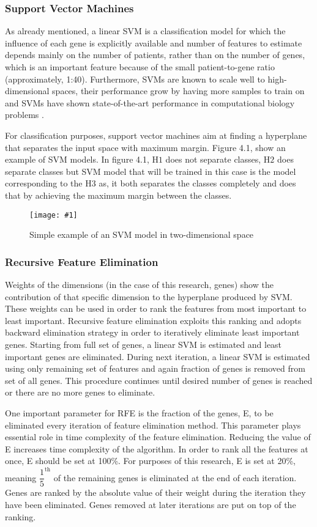 \documentclass{ba-kecs}
\numberwithin{figure}{section}
\numberwithin{equation}{section}
\newcommand{\dkepic}[2]{ %
	\begin{figure}[H] %
	\centerline{\texttt{[image: \#1]}}
	\caption{#2}
	\label{#1}
	\end{figure}
}
\begin{document}
\subsubsection{Support Vector Machines}

As already mentioned, a linear SVM is a classification model for which the influence of each gene is explicitly available and number of features to estimate depends mainly on the number of patients, rather than on the number of genes, which is an important feature because of the small patient-to-gene ratio (approximately, 1:40). Furthermore, SVMs are known to scale well to high-dimensional spaces, their performance grow by having more samples to train on and SVMs have shown state-of-the-art performance in computational biology problems \cite{benhur}.

For classification purposes, support vector machines aim at finding a hyperplane that separates the input space with maximum margin. Figure 4.1, show an example of SVM models. In figure 4.1, $\mathrm{H1}$ does not separate classes, $\mathrm{H2}$ does separate classes but SVM model that will be trained in this case is the model corresponding to the $\mathrm{H3}$ as, it both separates the classes completely and does that by achieving the maximum margin between the classes.
\dkepic{SVM}{Simple example of an SVM model in two-dimensional space}

\subsubsection{Recursive Feature Elimination}

Weights of the dimensions (in the case of this research, genes) show the contribution of that specific dimension to the hyperplane produced by SVM. These weights can be used in order to rank the features from most important to least important. Recursive feature elimination exploits this ranking and adopts backward elimination strategy in order to iteratively eliminate least important genes. Starting from full set of genes, a linear SVM is estimated and least important genes are eliminated. During next iteration, a linear SVM is estimated using only remaining set of features and again fraction of genes is removed from set of all genes. This procedure continues until desired number of genes is reached or there are no more genes to eliminate. 

One important parameter for RFE is the fraction of the genes, E, to be eliminated every iteration of feature elimination method. This parameter plays essential role in time complexity of the feature elimination. Reducing the value of E increases time complexity of the algorithm. In order to rank all the features at once, E should be set at 100\%. For purposes of this research, E is set at 20\%, meaning $\dfrac{1}{5}^{\mathrm{th}}$ of the remaining genes is eliminated at the end of each iteration. Genes are ranked by the absolute value of their weight during the iteration they have been eliminated. Genes removed at later iterations are put on top of the ranking.
\end{document}

